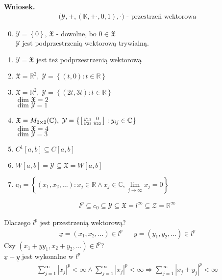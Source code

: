 \textbf{Wniosek.}
\begin{gather*}
\bigl(\mathcal Y,+,\left(\mathbb K,+\cdot,0,1\right),\cdot \bigr)\text{ - przestrzeń wektorowa}
\end{gather*}
\begin{prz}\indent
\begin{enumerate}
\setcounter{enumi}{-1}
\item $ \mathcal Y=\left\{0\right\} $, $ \mathfrak X $ - dowolne, bo $ 0\in\mathfrak X $\\
$ \mathcal Y $ jest podprzestrzenią wektorową trywialną.
\item $ \mathcal Y=\mathfrak X $ jest też podprzestrzenią wektorową
\item $ \mathfrak X=\mathbb R ^2,\;\mathcal Y=\left\{(t,0):t\in \mathbb R \right\} $
\item $ \mathfrak X=\mathbb R ^2,\;\mathcal Y=\left\{(2t,3t):t\in \mathbb R \right\} $\\
$ \dim\mathfrak X=2 $\\
$ \dim\mathcal Y=1 $
\item $ \mathfrak X=M_{2\times 2}(\mathbb C),\;\mathcal Y=\left\{\begin{bsmallmatrix}
y_{11}&0\\
y_{21}&y_{22}
\end{bsmallmatrix}
:y_{ij}\in \mathbb C\right\} $\\
$ \dim\mathfrak X=4 $\\
$ \dim\mathcal Y=3 $
\item $ C^1[a,b]\subseteq C[a,b] $
\item $ W[a,b]=\mathcal Y\subseteq\mathfrak X=W[a,b] $
\item $ c_0=\left\{(x_1,x_2,\dots):x_j\in \mathbb R \wedge x_j\in \mathbb C,\lim\limits_{j\to\infty}x_j=0 \right\} $
\end{enumerate}
\begin{gather*}
l^p\subseteq c_0\subseteq \mathcal Y\subseteq \mathfrak X =l^\infty \subseteq \mathcal Z=\mathbb R ^\infty 
\end{gather*}
\end{prz}
Dlaczego $ l^p $ jest przestrzenią wektorową?
\begin{align*}
\underline x=\left(x_1,x_2,\dots \right) \in l^p&&
\underline y=\left(y_1,y_2,\dots \right) \in l^p
\end{align*}
Czy $ \left(x_1+yy_1,x_2+y_2,\dots \right)\in l^p $?\\
$ \underline x + \underline y $ jest wykonalne w $ l^p $
\begin{gather*}
\sum_{j=1}^{\infty }\left|x_j\right|^p<\infty \wedge 
\sum_{j=1}^{\infty }\left|x_j\right|^p<\infty \Rightarrow
\sum_{j=1}^{\infty }\left|x_j+y_j\right|^p<\infty 
\end{gather*}
